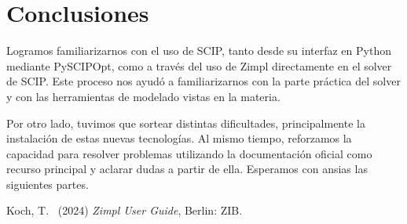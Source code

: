 \documentclass[11pt, a4paper, pdftex]{article}
\begin{document}
\section{Conclusiones}

Logramos familiarizarnos con el uso de SCIP, tanto desde su interfaz en
Python mediante PySCIPOpt, como a través del uso de Zimpl directamente
en el solver de SCIP. Este proceso nos ayudó a familiarizarnos con la
parte práctica del solver y con las herramientas de modelado vistas en
la materia.

Por otro lado, tuvimos que sortear distintas dificultades,
principalmente la instalación de estas nuevas tecnologías. Al mismo
tiempo, reforzamos la capacidad para resolver problemas utilizando la
documentación oficial como recurso principal y aclarar dudas a partir de
ella. Esperamos con ansias las siguientes partes.

\begin{thebibliography}{99}
	Koch, T.\
	(2024)
	\emph{Zimpl User Guide},
	Berlin: ZIB.
\end{thebibliography}
\end{document}

